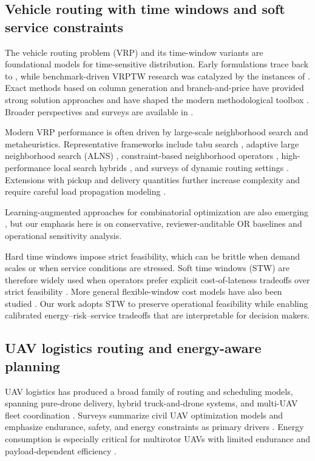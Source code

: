 \label{sec:related_work}

\subsection{Vehicle routing with time windows and soft service constraints}
The vehicle routing problem (VRP) and its time-window variants are foundational models for time-sensitive distribution. Early formulations trace back to \citet{dantzig1959}, while benchmark-driven VRPTW research was catalyzed by the instances of \citet{solomon1987}. Exact methods based on column generation and branch-and-price have provided strong solution approaches and have shaped the modern methodological toolbox \citep{desrochers1992}. Broader perspectives and surveys are available in \citet{laporte2009,tothvigo2014}.

Modern VRP performance is often driven by large-scale neighborhood search and metaheuristics. Representative frameworks include tabu search \citep{savelsbergh1985,gendreau1994}, adaptive large neighborhood search (ALNS) \citep{shaw1998,pisinger2007}, constraint-based neighborhood operators \citep{rousseau2002}, high-performance local search hybrids \citep{braysy2004}, and surveys of dynamic routing settings \citep{pillac2013}. Extensions with pickup and delivery quantities further increase complexity and require careful load propagation modeling \citep{parragh2008,ropke2006}.

Learning-augmented approaches for combinatorial optimization are also emerging \citep{cappart2023}, but our emphasis here is on conservative, reviewer-auditable OR baselines and operational sensitivity analysis.

Hard time windows impose strict feasibility, which can be brittle when demand scales or when service conditions are stressed. Soft time windows (STW) are therefore widely used when operators prefer explicit cost-of-lateness tradeoffs over strict feasibility \citep{taillard1997soft,cordeau2002,tothvigo2014}. More general flexible-window cost models have also been studied \citep{sungur2006flex}. Our work adopts STW to preserve operational feasibility while enabling calibrated energy--risk--service tradeoffs that are interpretable for decision makers.

\subsection{UAV logistics routing and energy-aware planning}
UAV logistics has produced a broad family of routing and scheduling models, spanning pure-drone delivery, hybrid truck-and-drone systems, and multi-UAV fleet coordination \citep{murray2015,agatz2018,poikonen2017,mathew2015}. Surveys summarize civil UAV optimization models and emphasize endurance, safety, and energy constraints as primary drivers \citep{otto2018}. Energy consumption is especially critical for multirotor UAVs with limited endurance and payload-dependent efficiency \citep{dorling2017}.

